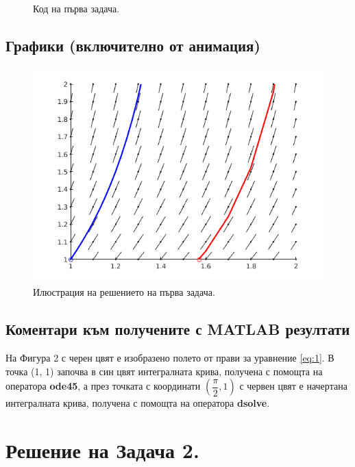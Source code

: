 \documentclass[14pt]{extarticle}
\let\frac\dfrac
\begin{document}
\begin{figure}[H]
	\begin{quote}
	
	\end{quote}
	\caption{Код на първа задача.}
\end{figure}

\subsection{Графики (включително от анимация)}

\begin{figure}[H]
	\centering
	\includegraphics{images/task1}
	\caption{Илюстрация на решението на първа задача.}
\end{figure}

\subsection{Коментари към получените с MATLAB резултати}

На Фигура 2 с черен цвят е изобразено полето от прави за уравнение \eqref{eq:1}.
В точка (1, 1) започва в син цвят интегралната крива, получена с помощта на оператора \textbf{ode45}, а през точката с координати $\left(\frac{\pi}{2},1\right)$ с червен цвят е начертана интегралната крива, получена с помощта на оператора \textbf{dsolve}.

\section{Решение на Задача 2.}
\end{document}
